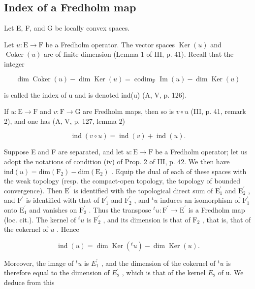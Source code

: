 \subsection{Index of a Fredholm map}

Let E, F, and G be locally convex spaces.

Let \(u \colon \mathrm{E} \to \mathrm{F}\) be a Fredholm operator. The vector spaces \(\operatorname{Ker}(u)\) and \(\operatorname{Coker}(u)\) are of finite dimension (Lemma 1 of III, p. 41). Recall that the integer

\[
\dim \operatorname{Coker} (u) - \dim \operatorname{Ker} (u) = \operatorname{codim} _ {\mathrm{F}} \operatorname{Im} (u) - \dim \operatorname{Ker} (u) \tag {1}
\]

is called the index of u and is denoted ind(u) (A, V, p. 126).

If \(u \colon \mathrm{E} \to \mathrm{F}\) and \(v \colon \mathrm{F} \to \mathrm{G}\) are Fredholm maps, then so is \(v \circ u\) (III, p. 41, remark 2), and one has (A, V, p. 127, lemma 2)

\[
\operatorname{ind} (v \circ u) = \operatorname{ind} (v) + \operatorname{ind} (u).\tag{2}
\]

Suppose E and F are separated, and let \(u\colon\mathrm{E}\to\mathrm{F}\) be a Fredholm operator; let us adopt the notations of condition (iv) of Prop. 2 of III, p. 42. We then have \(\mathrm{ind}(u)=\mathrm{dim}(\mathrm{F}_{2})-\mathrm{dim}(\mathrm{E}_{2})\) . Equip the dual of each of these spaces with the weak topology (resp. the compact-open topology, the topology of bounded convergence). Then \(\mathrm{E}^{\prime}\) is identified with the topological direct sum of \(\mathrm{E}_{1}^{\prime}\) and \(\mathrm{E}_{2}^{\prime}\) , and \(\mathrm{F}^{\prime}\) is identified with that of \(\mathrm{F}_{1}^{\prime}\) and \(\mathrm{F}_{2}^{\prime}\) , and \(^{t}u\) induces an isomorphism of \(\mathrm{F}_{1}^{\prime}\) onto \(\mathrm{E}_{1}^{\prime}\) and vanishes on \(\mathrm{F}_{2}^{\prime}\) . Thus the transpose \(^{t}u\colon\mathrm{F}^{\prime}\to\mathrm{E}^{\prime}\) is a Fredholm map (loc. cit.). The kernel of \(^{t}u\) is \(\mathrm{F}_{2}^{\prime}\) , and its dimension is that of \(\mathrm{F}_{2}\) , that is, that of the cokernel of \(u\) . Hence

\[
\operatorname{ind} (u) = \dim \operatorname{Ker} (^ {t} u) - \dim \operatorname{Ker} (u).\tag{3}
\]

Moreover, the image of \(^{t}u\) is \(E_{1}^{\prime}\) , and the dimension of the cokernel of \(^{t}u\) is therefore equal to the dimension of \(E_{2}^{\prime}\) , which is that of the kernel \(E_{2}\) of u. We deduce from this

